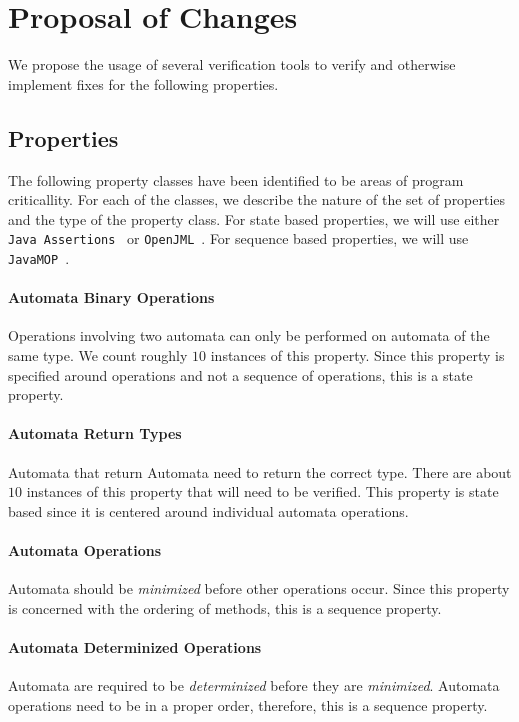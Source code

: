 \documentclass[letterpaper,11pt,twocolumn]{article}
\begin{document}
\section{Proposal of Changes}

We propose the usage of several verification tools to verify and otherwise
implement fixes for the following properties.

\subsection{Properties}

The following property classes have been identified to be areas of program
criticallity.  For each of the classes, we describe the nature of the set of
properties and the type of the property class.  For state based properties, we
will use either \texttt{Java Assertions}~\cite{oracle-java-assertions} or
\texttt{OpenJML}~\cite{openjml}.  For sequence based properties, we will use
\texttt{JavaMOP}~\cite{javamop}.

\paragraph{Automata Binary Operations} Operations involving two automata can
only be performed on automata of the same type.  We count roughly \(10\)
instances of this property.  Since this property is specified around operations
and not a sequence of operations, this is a state property.

\paragraph{Automata Return Types} Automata that return Automata need to
return the correct type.  There are about \(10\) instances of this property
that will need to be verified.  This property is state based since it is
centered around individual automata operations.

\paragraph{Automata Operations} Automata should be \textit{minimized} before
other operations occur.  Since this property is concerned with the ordering of
methods, this is a sequence property.

\paragraph{Automata Determinized Operations} Automata are required to be
\textit{determinized} before they are \textit{minimized}.  Automata operations
need to be in a proper order, therefore, this is a sequence property.
\end{document}
